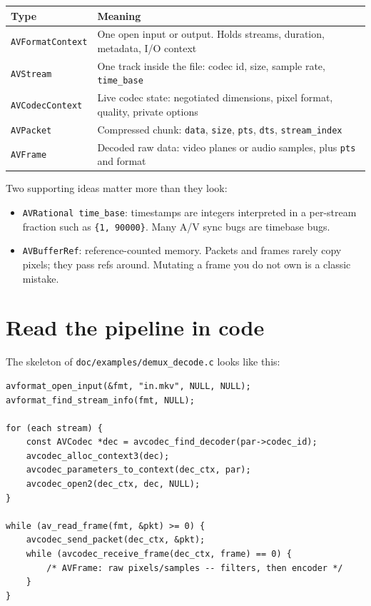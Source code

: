 \documentclass[11pt]{article}
\begin{document}
\begin{center}
\begin{tabular}{@{}p{} p{}@{}}
\hline
\textbf{Type} & \textbf{Meaning} \\
\hline
\verb|AVFormatContext| & One open input or output. Holds streams, duration, metadata, I/O context \\
\verb|AVStream|        & One track inside the file: codec id, size, sample rate, \verb|time_base| \\
\verb|AVCodecContext|  & Live codec state: negotiated dimensions, pixel format, quality, private options \\
\verb|AVPacket|        & Compressed chunk: \verb|data|, \verb|size|, \verb|pts|, \verb|dts|, \verb|stream_index| \\
\verb|AVFrame|         & Decoded raw data: video planes or audio samples, plus \verb|pts| and format \\
\hline
\end{tabular}
\end{center}

Two supporting ideas matter more than they look:

\begin{itemize}
  \item \verb|AVRational time_base|: timestamps are integers interpreted in a
        per-stream fraction such as \verb|{1, 90000}|. Many A/V sync bugs are
        timebase bugs.
  \item \verb|AVBufferRef|: reference-counted memory. Packets and frames rarely
        copy pixels; they pass refs around. Mutating a frame you do not own is
        a classic mistake.
\end{itemize}

\section{Read the pipeline in code}

The skeleton of \verb|doc/examples/demux_decode.c| looks like this:

\begin{verbatim}
avformat_open_input(&fmt, "in.mkv", NULL, NULL);
avformat_find_stream_info(fmt, NULL);

for (each stream) {
    const AVCodec *dec = avcodec_find_decoder(par->codec_id);
    avcodec_alloc_context3(dec);
    avcodec_parameters_to_context(dec_ctx, par);
    avcodec_open2(dec_ctx, dec, NULL);
}

while (av_read_frame(fmt, &pkt) >= 0) {
    avcodec_send_packet(dec_ctx, &pkt);
    while (avcodec_receive_frame(dec_ctx, frame) == 0) {
        /* AVFrame: raw pixels/samples -- filters, then encoder */
    }
}
\end{verbatim}
\end{document}
